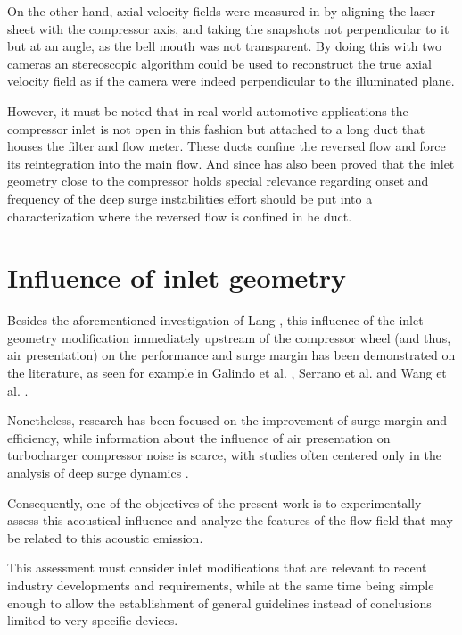 On the other hand, axial velocity fields were measured in \cite{guillou2010characterization,guillou2012piv} by aligning the laser sheet with the compressor axis, and taking the snapshots not perpendicular to it but at an angle, as the bell mouth was not transparent. By doing this with two cameras an stereoscopic algorithm could be used to reconstruct the true axial velocity field as if the camera were indeed perpendicular to the illuminated plane.

However, it must be noted that in real world automotive applications the compressor inlet is not open in this fashion but attached to a long duct that houses the filter and flow meter. These ducts confine the reversed flow and force its reintegration into the main flow. And since has also been proved that the inlet geometry close to the compressor holds special relevance regarding onset and frequency of the deep surge instabilities \cite{galindo2013engine} effort should be put into a characterization where the reversed flow is confined in he duct.

\section{Influence of inlet geometry}
\label{sec:liter_influence}

Besides the aforementioned investigation of Lang \cite{lang2011contribucion}, this influence of the inlet geometry modification immediately upstream of the compressor wheel (and thus, air presentation) on the performance and surge margin has been demonstrated on the literature, as seen for example in Galindo et al. \cite{galindo2007potential}, Serrano et al. \cite{serrano2013optimization} and Wang et al. \cite{wang2013cha}.

Nonetheless, research has been focused on the improvement of surge margin and efficiency, while information about the influence of air presentation on turbocharger compressor noise is scarce, with  studies often centered only in the analysis of deep surge dynamics  \cite{greitzer1976surge,hansen1981experimental}.

Consequently, one of the objectives of the present work is to experimentally assess this acoustical influence and analyze the features of the flow field that may be related to this acoustic emission. 

This assessment must consider inlet modifications that are relevant to recent industry developments and requirements, while at the same time being simple enough to allow the establishment of general guidelines instead of conclusions limited to very specific devices.

